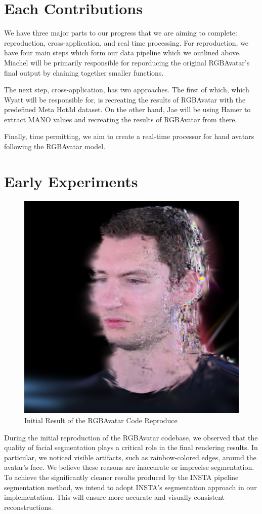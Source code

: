 \documentclass[11pt]{article}
\begin{document}
\section{Each Contributions}

We have three major parts to our progress that we are aiming to complete: reproduction, cross-application, and real time processing.
For reproduction, we have four main steps which form our data pipeline which we outlined above. Miachel will be primarily responsible 
for reporducing the original RGBAvatar's final output by chaining together smaller functions.

The next step, cross-application, has two approaches. The first of which, which Wyatt will be responsible for, is recreating the 
results of RGBAvatar with the predefined Meta Hot3d dataset. On the other hand, Jae will be using Hamer to extract MANO values and 
recreating the results of RGBAvatar from there.

Finally, time permitting, we aim to create a real-time processor for hand avatars following the RGBAvatar model.

\section{Early Experiments}

\begin{figure}[h!]
  \centering
  \includegraphics[width=0.7\columnwidth]{images/headImage.jpeg}
  \caption{Initial Result of the RGBAvatar Code Reproduce}
  \label{fig:Reproduce}
\end{figure}

During the initial reproduction of the RGBAvatar codebase, we observed that the quality of facial segmentation plays a critical role in the final rendering results.
In particular, we noticed visible artifacts, such as rainbow-colored edges, around the avatar's face. We believe these reasons are inaccurate or imprecise segmentation.
To achieve the significantly cleaner results produced by the INSTA pipeline segmentation method, we intend to adopt INSTA's segmentation approach in our implementation. 
This will ensure more accurate and visually consistent reconstructions.
\end{document}
